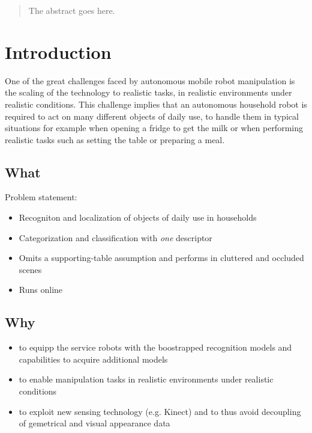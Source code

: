 \documentclass[conference]{sty/IEEEtran}
\begin{document}
\maketitle

\begin{abstract}
The abstract goes here.

\end{abstract}

\IEEEpeerreviewmaketitle

\section{Introduction}
One of the great challenges faced by autonomous mobile robot
manipulation is the scaling of the technology to realistic tasks, in
realistic environments under realistic conditions. This challenge
implies that an autonomous household robot is required to act on many
different objects of daily use, to handle them in typical situations
for example when opening a fridge to get the milk or when performing
realistic tasks such as setting the table or preparing a meal.

\subsection{What}
Problem statement:
\begin{itemize}
\item Recogniton and localization of objects of daily use in households
\item Categorization and classification with \emph{one} descriptor
\item Omits a supporting-table assumption and performs in cluttered and occluded scenes
\item Runs online
\end{itemize}


\subsection{Why}
\begin{itemize}
\item to equipp the service robots with the boostrapped recognition models and capabilities
to acquire additional models
\item to enable manipulation tasks in realistic environments under realistic conditions
\item to exploit new sensing technology (e.g. Kinect) and to thus avoid decoupling of gemetrical and
visual appearance data
\end{itemize}
\end{document}
